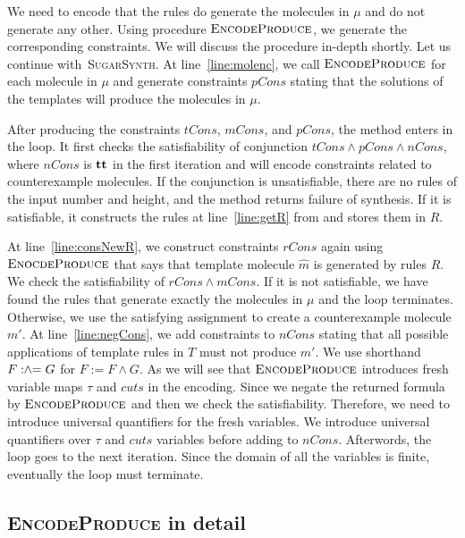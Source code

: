 We need to encode that the rules do generate the molecules
in $\mu$ and do not generate any other.
Using procedure $\textsc{EncodeProduce}$, we generate
the corresponding constraints.
We will discuss the procedure in-depth shortly.
Let us continue with~\textsc{SugarSynth}.
At line~\ref{line:molenc}, we call $\textsc{EncodeProduce}$ for
each molecule in $\mu$ and generate constraints $pCons$ stating that
the solutions of the templates will produce the molecules in $\mu$.

After producing the constraints $tCons$, $mCons$, and $pCons$,
the method enters in the loop.
It first checks the satisfiability of conjunction
$tCons \land pCons \land nCons$, where $nCons$ is $\mathbf{tt}$ in the first iteration
and will encode constraints related to counterexample molecules.
If the conjunction is unsatisfiable, there are no rules of
the input number and height,
and the method returns failure of synthesis.
If it is satisfiable, it constructs the rules at line~\ref{line:getR} from
and stores them in $R$.

At line~\ref{line:consNewR}, we construct constraints $rCons$ again using
$\textsc{EnocdeProduce}$ that says that template molecule $\hat{m}$
is generated by rules $R$.
We check the satisfiability of $rCons \land mCons$.
If it is not satisfiable, we have found the rules that generate exactly
the molecules in $\mu$ and the loop terminates.
Otherwise, we use the satisfying assignment to create a
counterexample molecule $m'$.
At line~\ref{line:negCons}, we add constraints to $nCons$ stating that
all possible applications of template rules in $T$ must not produce $m'$.
We use shorthand $F \mathrel{:\hspace{-3pt}\land\hspace{-3pt}=} G$ for $ F := F \land G$.
As we will see that $\textsc{EncodeProduce}$ introduces fresh variable
maps $\tau$ and $cuts$ in the encoding.
Since we negate the returned formula by $\textsc{EncodeProduce}$ 
and then we check the satisfiability.
Therefore, we need to introduce universal quantifiers for the
fresh variables.
We introduce universal quantifiers over $\tau$ and $cuts$
variables before adding to $nCons$.
Afterwords, the loop goes to the next iteration.
Since the domain of all the variables is finite, eventually the loop must
terminate.



\subsection{\textsc{EncodeProduce} in detail}


